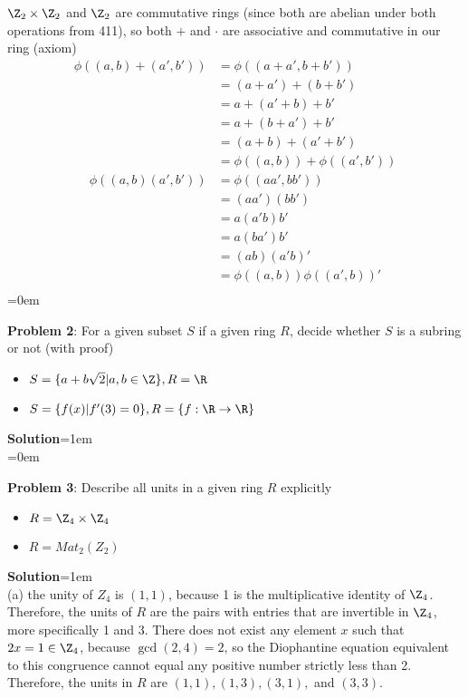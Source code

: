 \documentclass{article}
\begin{document}
$\Z_2 \times \Z_2$ and $\Z_2$ are commutative rings (since both are abelian under both operations from 411), so both $+$ and $\cdot$ are associative and commutative in our ring (axiom)
\begin{align*}
    \phi((a, b) + (a', b')) &= \phi((a + a', b + b'))\\
    &= (a + a') + (b + b')\\
    &= a + (a' + b) + b'\\ 
    &= a + (b + a') + b'\\ 
    &= (a + b) + (a' + b')\\
    &= \phi((a, b)) + \phi((a', b'))
\end{align*}
\begin{align*}
    \phi((a, b)(a', b')) &= \phi((aa', bb'))\\
    &= (aa')(bb')\\
    &= a(a'b)b'\\
    &= a(ba')b'\\
    &= (ab)(a'b)'\\
    &= \phi((a,b))\phi((a',b))'\\
\end{align*}
\newpage\parskip=0em
\begin{mdframed}[backgroundcolor=blue!20]
\textbf{Problem 2}: For a given subset $S$ if a given ring $R$, decide whether $S$ is a subring or not (with proof)
\begin{itemize}
    \item $S = \{ a + b\sqrt{2} | a, b \in\Z\}, R = \R$
    \item $S = \{ f(x) | f'(3) = 0\}, R = \{f : \R \to \R\}$
\end{itemize}
\end{mdframed}
\textbf{Solution}\parskip=1em\\

\newpage\parskip=0em
\begin{mdframed}[backgroundcolor=blue!20]
\textbf{Problem 3}: Describe all units in a given ring $R$ explicitly
\begin{itemize}
    \item $R = \Z_4 \times \Z_4$
    \item $R = Mat_2(Z_2)$
\end{itemize}
\end{mdframed}
\textbf{Solution}\parskip=1em\\
(a) the unity of $Z_4$ is $(1, 1)$, because 1 is the multiplicative identity of $\Z_4$. Therefore, the units of $R$ are the pairs with entries that are invertible in $\Z_4$, more specifically 1 and 3. There does not exist any element $x$ such that $2x = 1 \in \Z_4$, because $\gcd(2, 4) = 2$, so the Diophantine equation equivalent to this congruence cannot equal any positive number strictly less than 2. Therefore, the units in $R$ are $(1, 1), (1, 3), (3, 1), $ and $(3, 3)$.
\end{document}
